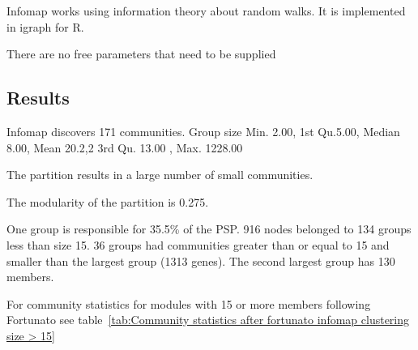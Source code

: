 Infomap works using information theory about random walks. It is implemented in igraph for R. 

There are no free parameters that need to be supplied

\subsection{Results}

Infomap discovers 171 communities. Group size  Min. 2.00, 1st  Qu.5.00,   Median 8.00,     Mean 20.2,2 3rd Qu. 13.00 ,  Max. 1228.00

The partition results in a large number of small communities. 

The modularity of the partition is 0.275.

One group is responsible for 35.5\% of the PSP. 916 nodes belonged to 134 groups less than size 15. 36 groups had communities greater than or equal to 15 and smaller than the largest group (1313 genes). The second largest group has 130 members.  

For community statistics for modules with 15 or more members following Fortunato \cite{fortunato2016community} see table~\ref{tab:Community statistics after fortunato infomap clustering size > 15}


